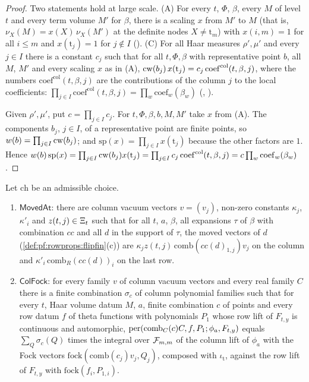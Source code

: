 \begin{proof}
Two statements hold at large scale.
(A) For every $t$, $\Phi$, $\beta$, every $M$ of level $t$ and every term volume $M'$ for $\beta$, there is a scaling $x$ from
$M'$ to $M$ (that is, $\nu_X(M)=x(X)\,\nu_X(M')$ at the definite nodes $X\ne\mathrm t_m$) with $x(i,m)=1$ for all $i\le m$
and $x(\mathrm t_j)=1$ for $j\notin I$ ().
(C) For all Haar measures $\rho',\mu'$ and every $j\in I$ there is a constant $c_j$ such that for all $t,\Phi,\beta$ with
representative point $b$, all $M$, $M'$ and every scaling $x$ as in (A),
$\mathrm{cw}(b_j)\,x(\mathrm t_j)=c_j\,\mathrm{coef}^{\mathrm{col}}(t,\beta,j)$, where the numbers $\mathrm{coef}^{\mathrm{col}}(t,\beta,j)$ are the
contributions of the column $j$ to the local coefficients:
$\prod_{j\in I}\mathrm{coef}^{\mathrm{col}}(t,\beta,j)=\prod_w\mathrm{coef}_w(\beta_w)$
(, ).

Given $\rho',\mu'$, put $c=\prod_{j\in I}c_j$. For $t,\Phi,\beta,b,M,M'$ take $x$ from (A). The components $b_j$, $j\in I$, of a
representative point are finite points, so $w(b)=\prod_{j\in I}\mathrm{cw}(b_j)$; and
$\mathrm{sp}(x)=\prod_{j\in I}x(\mathrm t_j)$ because the other factors are $1$. Hence
$w(b)\,\mathrm{sp}(x)=\prod_{j\in I}\mathrm{cw}(b_j)x(\mathrm t_j)=\prod_{j\in I}c_j\,\mathrm{coef}^{\mathrm{col}}(t,\beta,j)=c\prod_w\mathrm{coef}_w(\beta_w)$.
\end{proof}

\begin{definition}\label{def:pf:rowprops:moved}
Let $\mathrm{ch}$ be an admissible choice.
\begin{enumerate}[label=(\alph*)]
\item $\mathsf{MovedAt}$: there are column vacuum vectors $v=(v_j)$, non-zero constants $\kappa_j$, $\kappa'_i$ and
$z(t,j)\in\Xi_t$ such that for all $t$, $a$, $\beta$, all expansions $\tau$ of $\beta$ with combination $cc$ and all $d$
in the support of $\tau$, the moved vectors of $d$ (\cref{def:pf:rowprops:flipfin}(c)) are $\kappa_jz(t,j)\,\mathrm{comb}(cc(d)_{1,j})v_j$
on the column and $\kappa'_i\,\mathrm{comb}_R(cc(d))_i$ on the last row.
\item $\mathsf{ColFock}$: for every family $v$ of column vacuum vectors and every real family $C$ there is a finite combination
$\sigma_c$ of column polynomial families such that for every $t$, Haar volume datum $M$, $a$, finite combination $c$ of points
and every row datum $f$ of theta functions with polynomials $P_1$ whose row lift of $F_{t,y}$ is continuous and automorphic,
$\mathrm{per}(\mathrm{comb}_C(c)C,f,P_1;\phi_a,F_{t,y})$ equals $\sum_Q\sigma_c(Q)$ times the integral over
$\mathcal{F}_{m,m}$ of the column lift of $\phi_a$ with the Fock vectors $\mathrm{fock}(\mathrm{comb}(c_j)v_j,Q_j)$, composed with
$\iota_{\mathrm t}$, against the row lift of $F_{t,y}$ with $\mathrm{fock}(f_i,P_{1,i})$.
\end{enumerate}
\end{definition}

